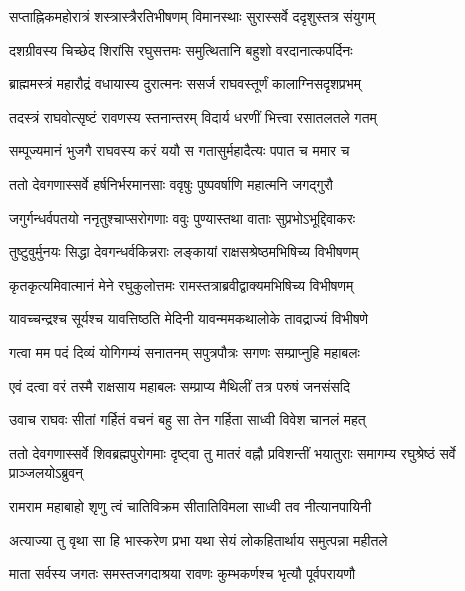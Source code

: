 \twolineshloka
{सप्ताह्निकमहोरात्रं शस्त्रास्त्रैरतिभीषणम्}
{विमानस्थाः सुरास्सर्वे ददृशुस्तत्र संयुगम्}%

\twolineshloka
{दशग्रीवस्य चिच्छेद शिरांसि रघुसत्तमः}
{समुत्थितानि बहुशो वरदानात्कपर्दिनः}%

\twolineshloka
{ब्राह्ममस्त्रं महारौद्रं वधायास्य दुरात्मनः}
{ससर्ज राघवस्तूर्णं कालाग्निसदृशप्रभम्}%

\twolineshloka
{तदस्त्रं राघवोत्सृष्टं रावणस्य स्तनान्तरम्}
{विदार्य धरणीं भित्त्वा रसातलतले गतम्}%

\twolineshloka
{सम्पूज्यमानं भुजगै राघवस्य करं ययौ}
{स गतासुर्महादैत्यः पपात च ममार च}%

\twolineshloka
{ततो देवगणास्सर्वे हर्षनिर्भरमानसाः}
{ववृषुः पुष्पवर्षाणि महात्मनि जगद्गुरौ}%

\twolineshloka
{जगुर्गन्धर्वपतयो ननृतुश्चाप्सरोगणाः}
{ववुः पुण्यास्तथा वाताः सुप्रभोऽभूद्दिवाकरः}%

\twolineshloka
{तुष्टुवुर्मुनयः सिद्धा देवगन्धर्वकिन्नराः}
{लङ्कायां राक्षसश्रेष्ठमभिषिच्य विभीषणम्}%

\twolineshloka
{कृतकृत्यमिवात्मानं मेने रघुकुलोत्तमः}
{रामस्तत्राब्रवीद्वाक्यमभिषिच्य विभीषणम्}%


\twolineshloka
{यावच्चन्द्रश्च सूर्यश्च यावत्तिष्ठति मेदिनी}
{यावन्ममकथालोके तावद्राज्यं विभीषणे}%

\twolineshloka
{गत्वा मम पदं दिव्यं योगिगम्यं सनातनम्}
{सपुत्रपौत्रः सगणः सम्प्राप्नुहि महाबलः}%


\twolineshloka
{एवं दत्वा वरं तस्मै राक्षसाय महाबलः}
{सम्प्राप्य मैथिलीं तत्र परुषं जनसंसदि}%

\twolineshloka
{उवाच राघवः सीतां गर्हितं वचनं बहु}
{सा तेन गर्हिता साध्वी विवेश चानलं महत्}%


\threelineshloka
{ततो देवगणास्सर्वे शिवब्रह्मपुरोगमाः}
{दृष्ट्वा तु मातरं वह्नौ प्रविशन्तीं भयातुराः}
{समागम्य रघुश्रेष्ठं सर्वे प्राञ्जलयोऽब्रुवन्}%


\twolineshloka
{रामराम महाबाहो शृणु त्वं चातिविक्रम}
{सीतातिविमला साध्वी तव नीत्यानपायिनी}%

\twolineshloka
{अत्याज्या तु वृथा सा हि भास्करेण प्रभा यथा}
{सेयं लोकहितार्थाय समुत्पन्ना महीतले}%

\twolineshloka
{माता सर्वस्य जगतः समस्तजगदाश्रया}
{रावणः कुम्भकर्णश्च भृत्यौ पूर्वपरायणौ}%

